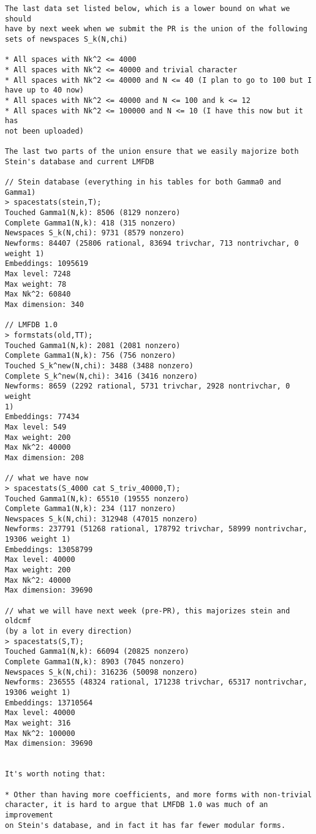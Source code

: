 \documentclass[11pt]{amsart}
\numberwithin{equation}{subsection}
\theoremstyle{plain}
\theoremstyle{definition}
\begin{document}
\begin{verbatim}
The last data set listed below, which is a lower bound on what we should 
have by next week when we submit the PR is the union of the following 
sets of newspaces S_k(N,chi)

* All spaces with Nk^2 <= 4000
* All spaces with Nk^2 <= 40000 and trivial character
* All spaces with Nk^2 <= 40000 and N <= 40 (I plan to go to 100 but I 
have up to 40 now)
* All spaces with Nk^2 <= 40000 and N <= 100 and k <= 12
* All spaces with Nk^2 <= 100000 and N <= 10 (I have this now but it has 
not been uploaded)

The last two parts of the union ensure that we easily majorize both 
Stein's database and current LMFDB

// Stein database (everything in his tables for both Gamma0 and Gamma1)
> spacestats(stein,T);
Touched Gamma1(N,k): 8506 (8129 nonzero)
Complete Gamma1(N,k): 418 (315 nonzero)
Newspaces S_k(N,chi): 9731 (8579 nonzero)
Newforms: 84407 (25806 rational, 83694 trivchar, 713 nontrivchar, 0 
weight 1)
Embeddings: 1095619
Max level: 7248
Max weight: 78
Max Nk^2: 60840
Max dimension: 340

// LMFDB 1.0
> formstats(old,TT);
Touched Gamma1(N,k): 2081 (2081 nonzero)
Complete Gamma1(N,k): 756 (756 nonzero)
Touched S_k^new(N,chi): 3488 (3488 nonzero)
Complete S_k^new(N,chi): 3416 (3416 nonzero)
Newforms: 8659 (2292 rational, 5731 trivchar, 2928 nontrivchar, 0 weight 
1)
Embeddings: 77434
Max level: 549
Max weight: 200
Max Nk^2: 40000
Max dimension: 208

// what we have now
> spacestats(S_4000 cat S_triv_40000,T);
Touched Gamma1(N,k): 65510 (19555 nonzero)
Complete Gamma1(N,k): 234 (117 nonzero)
Newspaces S_k(N,chi): 312948 (47015 nonzero)
Newforms: 237791 (51268 rational, 178792 trivchar, 58999 nontrivchar, 
19306 weight 1)
Embeddings: 13058799
Max level: 40000
Max weight: 200
Max Nk^2: 40000
Max dimension: 39690

// what we will have next week (pre-PR), this majorizes stein and oldcmf 
(by a lot in every direction)
> spacestats(S,T);
Touched Gamma1(N,k): 66094 (20825 nonzero)
Complete Gamma1(N,k): 8903 (7045 nonzero)
Newspaces S_k(N,chi): 316236 (50098 nonzero)
Newforms: 236555 (48324 rational, 171238 trivchar, 65317 nontrivchar, 
19306 weight 1)
Embeddings: 13710564
Max level: 40000
Max weight: 316
Max Nk^2: 100000
Max dimension: 39690


It's worth noting that:

* Other than having more coefficients, and more forms with non-trivial 
character, it is hard to argue that LMFDB 1.0 was much of an improvement 
on Stein's database, and in fact it has far fewer modular forms.


\end{verbatim}
\end{document}
